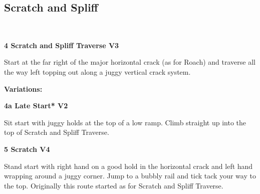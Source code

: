\begin{multicols}{2}
			\begin{minipage}{\columnwidth}
			\subsection*{Scratch and Spliff}\label{bf:Scratch and Spliff}
			\
			
			\end{minipage}
			
					\begin{minipage}{\linewidth}	
					\label{rt:Scratch and Spliff Traverse}
\colorbox{green!20}{
\parbox{0.95\textwidth}{
\textbf{
4 Scratch and Spliff Traverse V3     
}
}
}

					\begin{adjustwidth}{0.5cm}{}				
					Start at the far right of the major horizontal crack (as for Roach) and traverse all the way left topping out along a juggy vertical crack system.
					\end{adjustwidth}
					\end{minipage}
						\begin{adjustwidth}{0.5cm}{}				
						\textbf{Variations:} \newline
							\begin{minipage}{\linewidth}	
							\label{vr:Late Start}
\colorbox{green!20}{
\parbox{0.95\textwidth}{
\textbf{
4a Late Start* V2    
}
}
}

							\begin{adjustwidth}{0.5cm}{}				
							Sit start with juggy holds at the top of a low ramp. Climb straight up into the top of Scratch and Spliff Traverse.
							\end{adjustwidth}
							\end{minipage}
						\end{adjustwidth}
					\begin{minipage}{\linewidth}	
					\label{rt:Scratch}
\colorbox{RoyalBlue!20}{
\parbox{0.95\textwidth}{
\textbf{
5 Scratch V4    
}
}
}

					\begin{adjustwidth}{0.5cm}{}				
					Stand start with right hand on a good hold in the horizontal crack and left hand wrapping around a juggy corner. Jump to a bubbly rail and tick tack your way to the top. Originally this route started as for Scratch and Spliff Traverse.
					\end{adjustwidth}
					\end{minipage}


\end{multicols}
